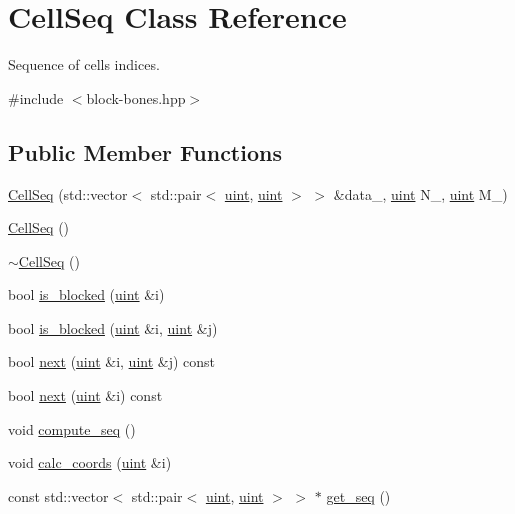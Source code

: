 \hypertarget{class_cell_seq}{}\section{Cell\+Seq Class Reference}
\label{class_cell_seq}


Sequence of cells indices.  




{\ttfamily \#include $<$block-\/bones.\+hpp$>$}

\subsection*{Public Member Functions}
\begin{DoxyCompactItemize}
\item 
\hyperlink{class_cell_seq_a3f1fcc18a3e9a9572d403791368f0db7}{Cell\+Seq} (std\+::vector$<$ std\+::pair$<$ \hyperlink{typedefs_8hpp_a91ad9478d81a7aaf2593e8d9c3d06a14}{uint}, \hyperlink{typedefs_8hpp_a91ad9478d81a7aaf2593e8d9c3d06a14}{uint} $>$ $>$ \&data\+\_\+, \hyperlink{typedefs_8hpp_a91ad9478d81a7aaf2593e8d9c3d06a14}{uint} N\+\_\+, \hyperlink{typedefs_8hpp_a91ad9478d81a7aaf2593e8d9c3d06a14}{uint} M\+\_\+)
\item 
\hyperlink{class_cell_seq_a92513554c453533b27ebcc1486452a00}{Cell\+Seq} ()
\item 
\hyperlink{class_cell_seq_a1ed463a49ab2ea5f1ff704b74eb68515}{$\sim$\+Cell\+Seq} ()
\item 
bool \hyperlink{class_cell_seq_a994900efdcf73e7619f728d584e92c5a}{is\+\_\+blocked} (\hyperlink{typedefs_8hpp_a91ad9478d81a7aaf2593e8d9c3d06a14}{uint} \&i)
\item 
bool \hyperlink{class_cell_seq_a5a5730ec094c9a4251753302a9504149}{is\+\_\+blocked} (\hyperlink{typedefs_8hpp_a91ad9478d81a7aaf2593e8d9c3d06a14}{uint} \&i, \hyperlink{typedefs_8hpp_a91ad9478d81a7aaf2593e8d9c3d06a14}{uint} \&j)
\item 
bool \hyperlink{class_cell_seq_a05687b1000bcce13c0f81c0203363ce7}{next} (\hyperlink{typedefs_8hpp_a91ad9478d81a7aaf2593e8d9c3d06a14}{uint} \&i, \hyperlink{typedefs_8hpp_a91ad9478d81a7aaf2593e8d9c3d06a14}{uint} \&j) const
\item 
bool \hyperlink{class_cell_seq_a799a65f5ea44cc1c752d39d6e7613364}{next} (\hyperlink{typedefs_8hpp_a91ad9478d81a7aaf2593e8d9c3d06a14}{uint} \&i) const
\item 
void \hyperlink{class_cell_seq_a6588fe1ad4e37f7a845386eca46c13c2}{compute\+\_\+seq} ()
\item 
void \hyperlink{class_cell_seq_afce7ba75badccac90475c853368424ad}{calc\+\_\+coords} (\hyperlink{typedefs_8hpp_a91ad9478d81a7aaf2593e8d9c3d06a14}{uint} \&i)
\item 
const std\+::vector$<$ std\+::pair$<$ \hyperlink{typedefs_8hpp_a91ad9478d81a7aaf2593e8d9c3d06a14}{uint}, \hyperlink{typedefs_8hpp_a91ad9478d81a7aaf2593e8d9c3d06a14}{uint} $>$ $>$ $\ast$ \hyperlink{class_cell_seq_a12235ff9c4a0183ed477679b61c4a19a}{get\+\_\+seq} ()
\end{DoxyCompactItemize}
